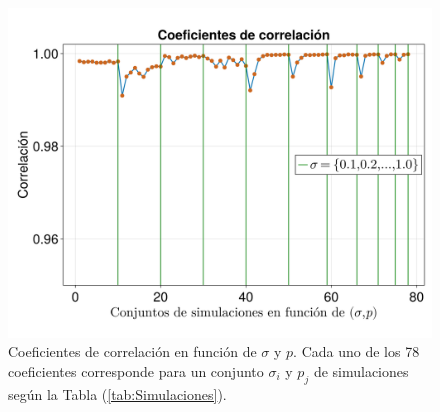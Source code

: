 \begin{figure}[h!]
	\centering
	\includegraphics[scale=0.2]{../Imagenes/CoeficientesCorrelacionN}
	\caption{Coeficientes de correlación en función de $\sigma$ y $p$. Cada uno de los 78 coeficientes corresponde para un conjunto $\sigma_i$ y $p_j$ de simulaciones según la Tabla (\ref{tab:Simulaciones}).}
	\label{fig:CoeficientesCorrelacionN}
\end{figure}

